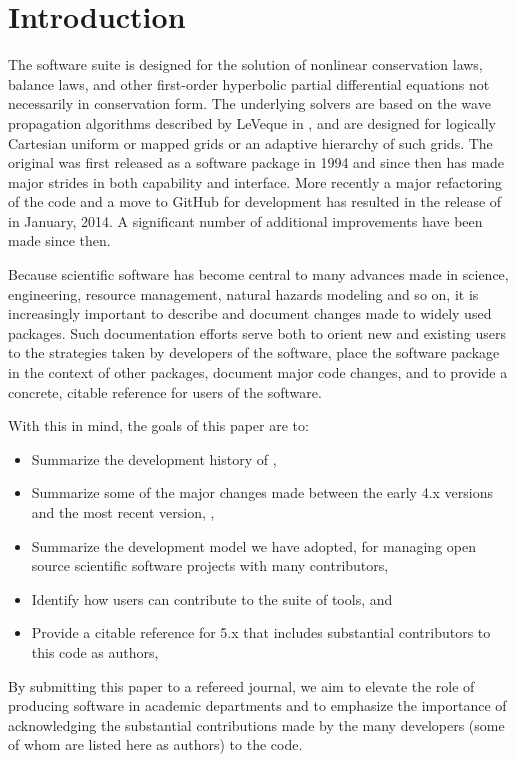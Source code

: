 %
%
%

\section{Introduction}\label{sec:intro}

The \clawpack software suite \cite{clawpack} is designed for the
solution of nonlinear conservation laws, balance laws, and other
first-order hyperbolic partial differential equations not necessarily
in conservation form.  The underlying solvers are based on the wave
propagation algorithms described by LeVeque in \cite{rjl:fvmhp}, and
are designed for logically Cartesian uniform or mapped grids or an
adaptive hierarchy of such grids.  The original \clawpack was first
released as a software package in 1994 and since then has made major
strides in both capability and interface. More recently a major
refactoring of the code and a move to GitHub for development has
resulted in the release of  in January, 2014. A
significant number of additional improvements have been made since
then.

Because scientific software  has become central to many advances made
in science, engineering, resource management, natural hazards modeling
and so on, it is increasingly important to describe and
document changes made to widely used packages.  Such documentation efforts
serve both to orient new and existing users to the  strategies
taken by developers of the software, place the software package in the context
of other packages, document major code changes, and to provide a
concrete, citable reference for users of the software.

With this in mind, the goals of this paper are to:

\begin{itemize}
\item Summarize the development history of \clawpack,
\item Summarize some of the major changes made between the early \clawpack
4.x versions and the most recent version, ,
\item Summarize the development model we have adopted, for
managing open source scientific software
projects with many contributors,
\item Identify how users can contribute to the \clawpack suite of tools, and
\item Provide a citable reference for \clawpack 5.x that includes
substantial contributors to this code as authors,
\end{itemize}
By submitting this paper to a refereed journal, we aim to elevate the role of
producing software in academic departments and to emphasize the
importance of acknowledging the substantial contributions
made by the many developers (some of whom are listed here as authors) to the
\clawpack code.

